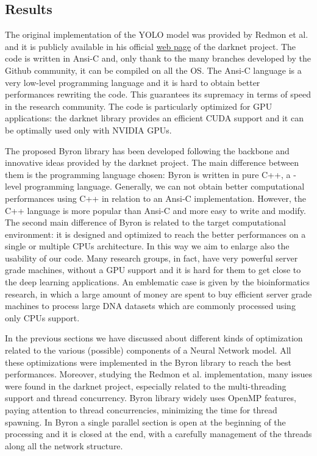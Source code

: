 \documentclass{standalone}
\begin{document}
\subsection[Results]{Results}\label{obj_detection:results}

The original implementation of the YOLO model was provided by Redmon et al. and it is publicly available in his official \href{https://pjreddie.com/darknet/yolo}{web page} of the \textsf{darknet} project.
The code is written in \textsf{Ansi-C} and, only thank to the many branches developed by the \textsf{Github} community, it can be compiled on all the OS.
The \textsf{Ansi-C} language is a very low-level programming language and it is hard to obtain better performances rewriting the code.
This guarantees its supremacy in terms of speed in the research community.
The code is particularly optimized for GPU applications: the \textsf{darknet} library provides an efficient \textsf{CUDA} support and it can be optimally used only with NVIDIA GPUs.

The proposed \textsf{Byron} library has been developed following the backbone and innovative ideas provided by the \textsf{darknet} project.
The main difference between them is the programming language chosen: \textsf{Byron} is written in pure \textsf{C++}, a -level programming language.
Generally, we can not obtain better computational performances using \textsf{C++} in relation to an \textsf{Ansi-C} implementation.
However, the \textsf{C++} language is more popular than \textsf{Ansi-C} and more easy to write and modify.
The second main difference of \textsf{Byron} is related to the target computational environment: it is designed and optimized to reach the better performances on a single or multiple CPUs architecture.
In this way we aim to enlarge also the usability of our code.
Many research groups, in fact, have very powerful server grade machines, without a GPU support and it is hard for them to get close to the deep learning applications.
An emblematic case is given by the bioinformatics research, in which a large amount of money are spent to buy efficient server grade machines to process large DNA datasets which are commonly processed using only CPUs support.

In the previous sections we have discussed about different kinds of optimization related to the various (possible) components of a Neural Network model.
All these optimizations were implemented in the \textsf{Byron} library to reach the best performances.
Moreover, studying the Redmon et al. implementation, many issues were found in the \textsf{darknet} project, especially related to the multi-threading support and thread concurrency.
\textsf{Byron} library widely uses OpenMP features, paying attention to thread concurrencies, minimizing the time for thread spawning.
In \textsf{Byron} a single parallel section is open at the beginning of the processing and it is closed at the end, with a carefully management of the threads along all the network structure.
\end{document}
